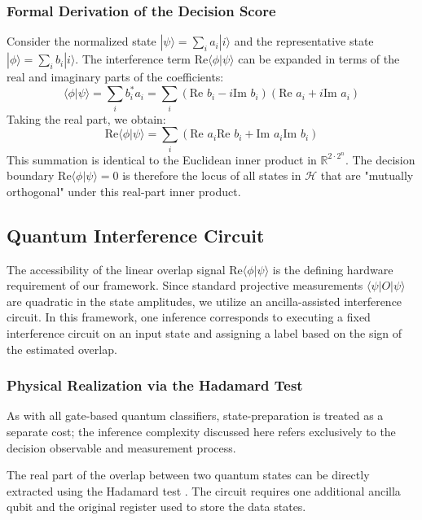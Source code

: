 \documentclass[conference]{IEEEtran}
\begin{document}
\subsubsection{Formal Derivation of the Decision Score}
Consider the normalized state $|\psi\rangle = \sum_i a_i |i\rangle$ and the representative state $|\phi\rangle = \sum_i b_i |i\rangle$. The interference term $\text{Re}\langle \phi | \psi \rangle$ can be expanded in terms of the real and imaginary parts of the coefficients:
\begin{equation}
    \langle \phi | \psi \rangle = \sum_i b_i^* a_i = \sum_i (\text{Re } b_i - i \text{Im } b_i)(\text{Re } a_i + i \text{Im } a_i)
\end{equation}
Taking the real part, we obtain:
\begin{equation}
    \text{Re}\langle \phi | \psi \rangle = \sum_i (\text{Re } a_i \text{Re } b_i + \text{Im } a_i \text{Im } b_i)
\end{equation}
This summation is identical to the Euclidean inner product in $\mathbb{R}^{2 \cdot 2^n}$. The decision boundary $\text{Re}\langle \phi | \psi \rangle = 0$ is therefore the locus of all states in $\mathcal{H}$ that are "mutually orthogonal" under this real-part inner product.

\subsection{Quantum Interference Circuit}
The accessibility of the linear overlap signal $\mathrm{Re}\langle \phi | \psi \rangle$ is the defining hardware requirement of our framework. Since standard projective measurements $\langle \psi | O | \psi \rangle$ are quadratic in the state amplitudes, we utilize an ancilla-assisted interference circuit. In this framework, one inference corresponds to executing a fixed interference circuit on an input state and assigning a label based on the sign of the estimated overlap.

\subsubsection{Physical Realization via the Hadamard Test}
As with all gate-based quantum classifiers, state-preparation is treated as a separate cost; the inference complexity discussed here refers exclusively to the decision observable and measurement process.

The real part of the overlap between two quantum states can be directly extracted using the Hadamard test \cite{ekert2002direct}. The circuit requires one additional ancilla qubit and the original register used to store the data states.
\end{document}
